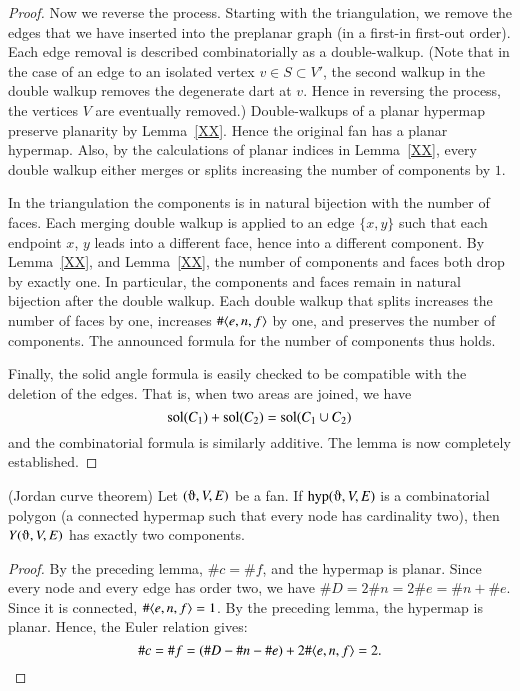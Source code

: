 \begin{proof}
Now we reverse the process.  Starting with the triangulation, we remove the
edges that we have inserted into the preplanar graph  (in a first-in first-out order).  
Each edge removal is
described combinatorially as a double-walkup.  (Note that
in the case of an edge to an isolated vertex  $v\in S\subset V'$, the second walkup
in the double walkup
 removes the degenerate dart at $v$.  Hence in reversing the process,
the vertices $V$ are eventually removed.)  Double-walkups of
a planar hypermap preserve planarity by Lemma~\ref{XX}.  Hence the original
fan has a planar hypermap.  Also, by the calculations of planar indices
in Lemma~\ref{XX}, every double walkup either merges or  splits
 increasing the number of components by $1$.

In the triangulation the components is in natural bijection with the number of faces.
Each merging double walkup is applied to an edge $\{x,y\}$ such that each endpoint $x$,
$y$ leads into a different face, hence into a different component.  By Lemma~\ref{XX},
and Lemma~\ref{XX}, the number of components and faces both drop by exactly one.
In particular, the components and faces remain in natural bijection after the
double walkup.  Each double walkup that splits increases the number of faces by one,
increases $\#\langle e,n,f\rangle$ by one, and preserves the number of components.
The announced formula for the number of components thus holds.

Finally, the solid angle formula is easily checked to be compatible with
the deletion of the edges.  That is, when two areas are joined, we have
  $${\operatorname{sol}}(C_1) + {\operatorname{sol}}(C_2) = {\operatorname{sol}}(C_1\cup C_2)$$
and the combinatorial formula is similarly additive.
The lemma is now completely established.
\end{proof}



\begin{lemma} (Jordan curve theorem)  Let $(\orgn,V,E)$ be a fan.
If $\op{hyp}(\orgn,V,E)$ is a combinatorial polygon (a
connected hypermap such that every node has cardinality two), then
$Y(\orgn,V,E)$ has exactly two components.
\end{lemma}

\begin{proof} By the preceding lemma, $\# c = \#f$, and the
hypermap is planar.  Since every node and every edge has order two,
we have $\#D = 2\#n = 2\# e = \#n +\#e$.  Since it is connected,
$\#\langle e,n,f\rangle = 1$.  By the preceding lemma, the hypermap is
planar. Hence, the Euler relation gives:
    $$
    \#c = \#f = (\#D - \#n - \#e) + 2\#\langle e,n,f\rangle =2.
    $$
\end{proof}


